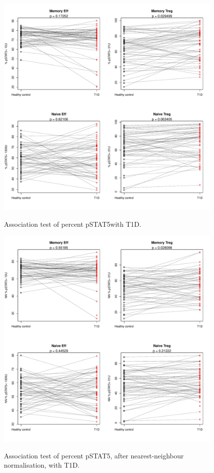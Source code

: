 \begin{figure}
\centering
\begin{minipage}{.7\textwidth}
\includegraphics[width=\linewidth]{figures/pstat5-pos-t1d-celltypes}
\end{minipage}
{ Association test of percent pSTAT5\positive with T1D. }
{ }
\begin{minipage}{.7\textwidth}
\includegraphics[width=\linewidth]{figures/nn-pstat5-pos-t1d-celltypes}
\end{minipage}
{ Association test of percent pSTAT5\positive, after nearest-neighbour normalisation, with T1D.  }
{ } 
\end{figure}


